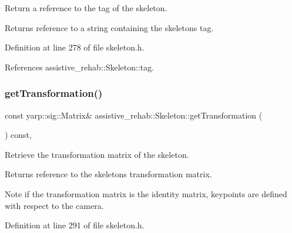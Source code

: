 Return a reference to the tag of the skeleton. 

\begin{DoxyReturn}{Returns}
reference to a string containing the skeleton\textquotesingle{}s tag. 
\end{DoxyReturn}


Definition at line 278 of file skeleton.\+h.


\begin{DoxyCode}{0}

\end{DoxyCode}


References assistive\+\_\+rehab\+::\+Skeleton\+::tag.

\mbox{\label{classassistive__rehab_1_1Skeleton_a2bdcc0d686a5a232aa2c07528cf2e647}} 
\subsubsection{\texorpdfstring{getTransformation()}{getTransformation()}}
{\footnotesize\ttfamily const yarp\+::sig\+::\+Matrix\& assistive\+\_\+rehab\+::\+Skeleton\+::get\+Transformation (\begin{DoxyParamCaption}{ }\end{DoxyParamCaption}) const\hspace{0.3cm}{\ttfamily [inline]}, {\ttfamily [inherited]}}



Retrieve the transformation matrix of the skeleton. 

\begin{DoxyReturn}{Returns}
reference to the skeleton\textquotesingle{}s transformation matrix. 
\end{DoxyReturn}
\begin{DoxyNote}{Note}
if the transformation matrix is the identity matrix, keypoints are defined with respect to the camera. 
\end{DoxyNote}


Definition at line 291 of file skeleton.\+h.


\begin{DoxyCode}{0}

\end{DoxyCode}


